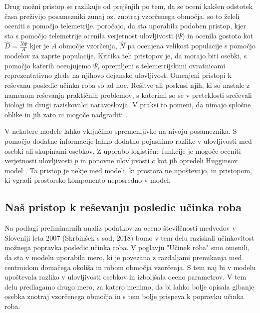 Drug možni pristop se razlikuje od prejšnjih po tem, da se oceni kakšen odstotek časa preživijo posamezniki zunaj oz. znotraj vzorčenega območja. \citet{ivan_using_2013-1} so to želeli oceniti s pomočjo telemetrije. \citet{royle_spatial_2013} poročajo, da sta \citet{white_chapter_2001} uporabila podoben pristop, kjer sta s pomočjo telemetrije ocenila verjetnost ulovljivosti ($\Psi$) in ocenila gostoto kot $\hat{D} = \frac{\hat{N} \Psi}{A}$ kjer je $A$ območje vzorčenja, $\hat{N}$ pa ocenjena velikost populacije s pomočjo modelov za zaprte populacije. Kritika teh pristopov je, da morajo biti osebki, s pomočjo katerih ocenjujemo $\Psi$, opremljeni s telemetrijskimi ovratnicami reprezentativno glede na njihovo dejansko ulovljivost.
Omenjeni pristopi k reševanu posledic učinka roba so ad hoc. Rešitve ali poskusi njih, ki so nastale z namenom reševanja praktičnih problemov, s katerimi so se v preteklosti srečevali biologi in drugi raziskovalci naravoslovja. V praksi to pomeni, da nimajo splošne oblike in jih zato ni mogoče nadgraditi \citep{royle_spatial_2013}.

V nekatere modele lahko vključimo spremenljivke na nivoju posameznika. S pomočjo dodatne informacije lahko dodatno pojasnimo razlike v ulovljivosti med osebki ali skupinami osebkov. Z uporabo logistične funkcije je mogoče oceniti verjetnosti ulovljivosti $p$ in ponovne ulovljivosti $c$ kot jih opredeli Hugginsov model \citep{boulanger_corrigendum:_2001, boulanger_sources_2004}. Ta pristop je nekje med modeli, ki prostora ne upoštevajo, in pristopom, ki vgradi prostorsko komponento neposredno v model.

\subsection{Naš pristop k reševanju posledic učinka roba}
Na podlagi preliminarnih analiz podatkov za oceno številčnosti medvedov v Sloveniji leta 2007 (Skrbinšek s sod, 2018) bomo v tem delu raziskali učinkovitost možnega popravka posledic učinka roba. V poglavju "Učinek roba" smo omenili, da sta \citet{boulanger_corrigendum:_2001} v modelu uporabila mero, ki je povezana z razdaljami premikanja med centroidom domačega okoliša in robom območja vzorčenja. S tem naj bi v modelu upoštevala razliko v ulovljivosti osebkov in izboljšala oceno parametrov. V tem delu predlagamo drugo mero, za katero menimo, da bi lahko bolje opisala gibanje osebka znotraj vzorčenega območja in s tem bolje prispeva k popravku učinka roba.

